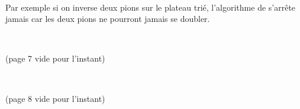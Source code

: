 \documentclass[a7paper,pagesize,DIV=14,10pt]{scrbook}
\begin{document}
\begin{minipage}{.4\linewidth}
\end{minipage}~
\begin{minipage}{.6\linewidth}
  Par exemple si on inverse deux pions sur le plateau trié,
  l'algorithme de s'arrête jamais car les deux pions ne pourront
  jamais se doubler.
\end{minipage}


\newpage ~\vfill \centerline{(page 7 vide pour l'instant)} \vfill
\newpage ~\vfill \centerline{(page 8 vide pour l'instant)} \vfill
\end{document}
